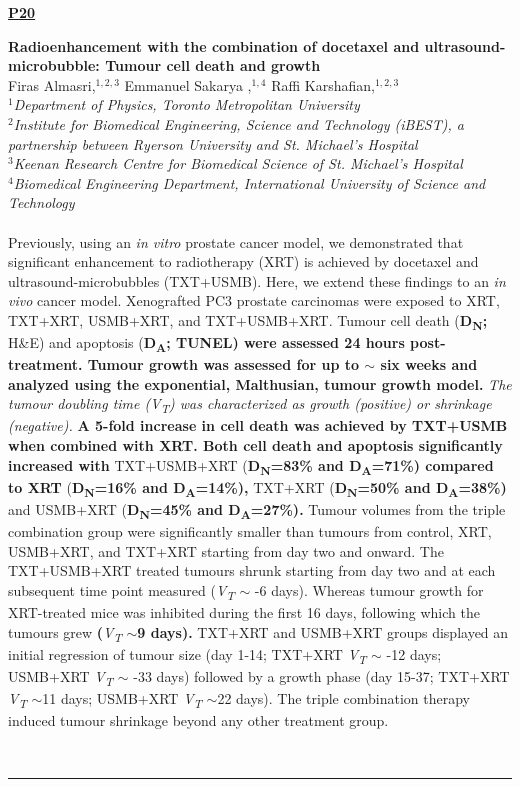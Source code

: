 \documentclass[titlepage,oneside,openany,10pt]{book}
\newenvironment{posterabs}[4] %
        {
	\begin{flushright}
                \underline{\textbf{#4}}
        \end{flushright}
        \textbf{#1}\\%
        #2\\%
        \textit{#3}\\\\%
        }
        {
        \\
        \noindent\rule{15cm}{0.5pt}%
        }
\begin{document}
\begin{posterabs}
	{Radioenhancement with the combination of docetaxel and ultrasound-microbubble: Tumour cell death and growth}
	{Firas Almasri,$^{1,2,3}$ Emmanuel Sakarya ,$^{1,4}$ Raffi Karshafian,$^{1,2,3}$}
	{
	$^1$Department of Physics, Toronto Metropolitan University\\
	$^2$Institute for Biomedical Engineering, Science and Technology (iBEST), a partnership between Ryerson University and St. Michael's Hospital\\
	$^3$Keenan Research Centre for Biomedical Science of St. Michael's Hospital\\
	$^4$Biomedical Engineering Department, International University of Science and Technology
	}
	{P20}
	Previously, using an \emph{in vitro} prostate cancer model, we demonstrated that significant enhancement to radiotherapy (XRT) is achieved by docetaxel and ultrasound-microbubbles (TXT+USMB). Here, we extend these findings to an \emph{in vivo} cancer model. Xenografted PC3 prostate carcinomas were exposed to XRT, TXT+XRT, USMB+XRT, and TXT+USMB+XRT. Tumour cell death (\textbf{D\textsubscript{N};} H\&E) and apoptosis (\textbf{D\textsubscript{A}; TUNEL) were assessed 24 hours post-treatment. Tumour growth was assessed for up to $\sim$ six weeks and analyzed using the exponential, Malthusian, tumour growth model.}  \emph{The tumour doubling time (V\textsubscript{T}) was characterized as growth (positive) or shrinkage (negative).}  \textbf{A 5-fold increase in cell death was achieved by TXT+USMB when combined with XRT. Both cell death and apoptosis significantly increased with} TXT+USMB+XRT (\textbf{D\textsubscript{N}=83\% and D\textsubscript{A}=71\%) compared to XRT} (\textbf{D\textsubscript{N}=16\% and D\textsubscript{A}=14\%),} TXT+XRT (\textbf{D\textsubscript{N}=50\% and D\textsubscript{A}=38\%)} and USMB+XRT (\textbf{D\textsubscript{N}=45\% and D\textsubscript{A}=27\%).} Tumour volumes from the triple combination group were significantly smaller than tumours from control, XRT, USMB+XRT, and TXT+XRT starting from day two and onward. The TXT+USMB+XRT treated tumours shrunk starting from day two and at each subsequent time point measured (\emph{V\textsubscript{T}} $\sim$ -6 days). Whereas tumour growth for XRT-treated mice was inhibited during the first 16 days, following which the tumours grew \textbf{(}\emph{V\textsubscript{T}}  \textbf{$\sim$9 days).} TXT+XRT and USMB+XRT groups displayed an initial regression of tumour size (day 1-14; TXT+XRT \emph{V\textsubscript{T}} $\sim$ -12 days; USMB+XRT \emph{V\textsubscript{T}} $\sim$ -33 days) followed by a growth phase (day 15-37; TXT+XRT \emph{V\textsubscript{T}} $\sim$11 days; USMB+XRT \emph{V\textsubscript{T}} $\sim$22 days). The triple combination therapy induced tumour shrinkage beyond any other treatment group.
	\label{SakaryaE}
\end{posterabs}
\end{document}
